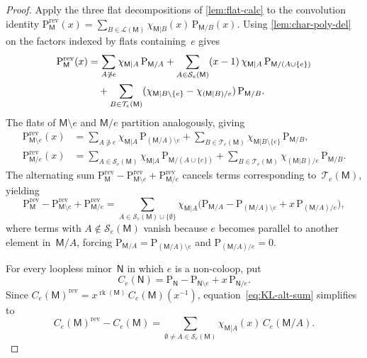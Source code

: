 \documentclass[12pt,letterpaper,english]{amsart}
\theoremstyle{teoremas}
\theoremstyle{definition}
\DeclareMathOperator{\rk}{rk}
\newcommand{\M}{\mathsf{M}}
\newcommand{\N}{\mathsf{N}}
\newcommand{\PP}{\mathrm{P}}
\newcommand{\rev}{\mathrm{rev}}
\newcommand{\Se}{\mathcal{S}_e}
\newcommand{\Te}{\mathcal{T}_e}
\begin{document}
\begin{proof}
Apply the three flat decompositions of \cref{lem:flat-calc} to the
convolution identity
$\PP^{\rev}_{\M}(x) = \sum_{B \in \mathcal{L}(\M)}
\chi_{\M|B}(x)\, \PP_{\M/B}(x)$.
Using \cref{lem:char-poly-del} on the factors indexed by flats containing~$e$ gives
\begin{align}
\PP^{\rev}_{\M}(x) &= \sum_{A \not\ni e} \chi_{\M|A}\, \PP_{\M/A}
  + \sum_{A \in \Se(\M)} (x-1)\, \chi_{\M|A}\, \PP_{\M/(A \cup \{e\})}
    \notag \\
&\quad + \sum_{B \in \Te(\M)}
    (\chi_{\M|B \setminus \{e\}} - \chi_{(\M|B)/e})\, \PP_{\M/B}.
    \label{eq:KL-expansion}
\end{align}
The flats of $\M \setminus e$ and $\M/e$ partition analogously, giving
\begin{align*}
\PP^{\rev}_{\M \setminus e}(x)
  &= \sum_{A \not\ni e} \chi_{\M|A}\, \PP_{(\M/A) \setminus e}
  + \sum_{B \in \Te(\M)}
    \chi_{\M|B \setminus \{e\}}\, \PP_{\M/B}, \\
\PP^{\rev}_{\M/e}(x)
  &= \sum_{A \in \Se(\M)} \chi_{\M|A}\, \PP_{\M/(A \cup \{e\})}
  + \sum_{B \in \Te(\M)}
    \chi_{(\M|B)/e}\, \PP_{\M/B}.
\end{align*}
The alternating sum
$\PP^{\rev}_{\M} - \PP^{\rev}_{\M \setminus e} + \PP^{\rev}_{\M/e}$
cancels terms corresponding to~$\Te(\M)$, yielding
\begin{equation}\label{eq:KL-alt-sum}
\PP^{\rev}_{\M} - \PP^{\rev}_{\M \setminus e} + \PP^{\rev}_{\M/e}
= \sum_{A \in \Se(\M) \cup \{\emptyset\}}
  \chi_{\M|A}\bigl(\PP_{\M/A} - \PP_{(\M/A) \setminus e}
  + x\, \PP_{(\M/A)/e}\bigr),
\end{equation}
where terms with $A \notin \Se(\M)$ vanish because $e$ becomes parallel
to another element in~$\M/A$, forcing
$\PP_{\M/A} = \PP_{(\M/A) \setminus e}$ and $\PP_{(\M/A)/e} = 0$.

For every loopless minor~$\N$ in which $e$ is a non-coloop, put
\[
C_e(\N) = \PP_{\N} - \PP_{\N \setminus e} + x\, \PP_{\N/e}.
\]
Since $C_e(\M)^{\rev} = x^{\rk(\M)}\, C_e(\M)(x^{-1})$,
equation~\eqref{eq:KL-alt-sum} simplifies to
\begin{equation}\label{eq:Ce-recursion}
C_e(\M)^{\rev} - C_e(\M)
= \sum_{\emptyset \neq A \in \Se(\M)}
  \chi_{\M|A}(x)\, C_e(\M/A).
\end{equation}


\end{proof}
\end{document}
